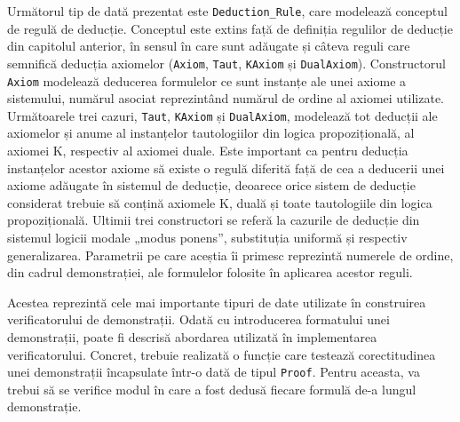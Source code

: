 \documentclass[12pt, openany]{book}
\begin{document}
            \par{}
                Următorul tip de dată prezentat este \texttt{Deduction\_Rule}, care modelează conceptul de regulă de 
                deducție. Conceptul este extins față de definiția regulilor de deducție din capitolul anterior, în 
                sensul în care sunt adăugate și câteva reguli care semnifică deducția axiomelor (\texttt{Axiom}, 
                \texttt{Taut}, \texttt{KAxiom} și \texttt{DualAxiom}). Constructorul \texttt{Axiom} modelează deducerea 
                formulelor ce sunt instanțe ale unei axiome a sistemului, numărul asociat reprezintând numărul de ordine 
                al axiomei utilizate. Următoarele trei cazuri, \texttt{Taut}, \texttt{KAxiom} și \texttt{DualAxiom}, 
                modelează tot deducții ale axiomelor și anume al instanțelor tautologiilor din logica propozițională, al 
                axiomei K, respectiv al axiomei duale. Este important ca pentru deducția instanțelor acestor axiome să 
                existe o regulă diferită față de cea a deducerii unei axiome adăugate în sistemul de deducție, deoarece 
                orice sistem de deducție considerat trebuie să conțină axiomele K, duală și toate tautologiile din 
                logica propozițională. Ultimii trei constructori se referă la cazurile de deducție din sistemul logicii 
                modale „modus ponens”, substituția uniformă și respectiv generalizarea. Parametrii pe care aceștia îi 
                primesc reprezintă numerele de ordine, din cadrul demonstrației, ale formulelor folosite în aplicarea 
                acestor reguli.

            \par{}
                Acestea reprezintă cele mai importante tipuri de date utilizate în construirea verificatorului de 
                demonstrații. Odată cu introducerea formatului unei demonstrații, poate fi descrisă abordarea utilizată 
                în implementarea verificatorului. Concret, trebuie realizată o funcție care testează corectitudinea unei 
                demonstrații încapsulate într-o dată de tipul \texttt{Proof}. Pentru aceasta, va trebui să se verifice 
                modul în care a fost dedusă fiecare formulă de-a lungul demonstrație.
\end{document}
